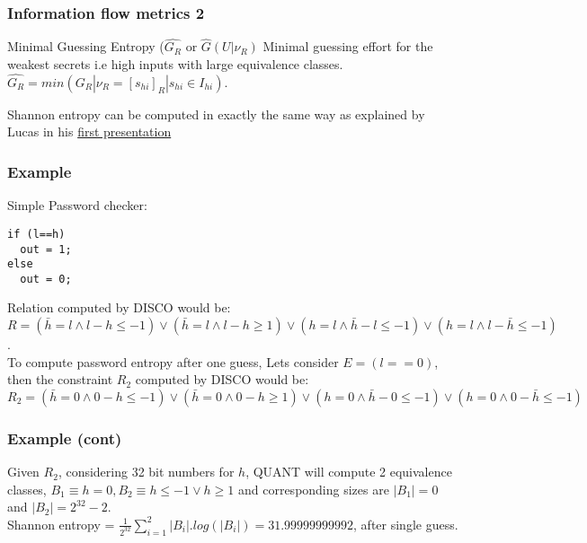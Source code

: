 \documentclass{beamer}
\begin{document}

\begin{frame}
\frametitle{Information flow metrics 2}
\begin{block}{Minimal Guessing Entropy ($\hat{G_{R}}$ or $\hat{G}(U|\nu_{R})$}
Minimal guessing effort for the weakest secrets i.e high inputs with large equivalence classes.\\
$\hat{G_{R}} = min(G_{R}|\nu_{R} = [s_{hi}]_{R} | s_{hi} \in I_{hi})$.
\end{block}
Shannon entropy can be computed in exactly the same way as explained by Lucas in his \href{http://link.springer.com/chapter/10.1007\%2F978-3-642-00596-1_21}{first presentation}
\end{frame}

\begin{frame}[fragile]
\frametitle{Example}
Simple Password checker:
\begin{lstlisting}[basicstyle=\ttfamily]
if (l==h)
  out = 1;
else
  out = 0;
\end{lstlisting}
Relation computed by DISCO would be:\\
$R = (\bar{h} = l \land l - h \leq -1) \lor (\bar{h} = l \land l - h \geq 1) \lor (h = l \land \bar{h} - l \leq -1) \lor (h = l \land l - \bar{h} \leq -1)$. \\
To compute password entropy after one guess, Lets consider $E = (l == 0)$, then the constraint $R_{2}$ computed by DISCO would be: $R_{2} = (\bar{h} = 0 \land 0 - h \leq -1) \lor (\bar{h} = 0 \land 0 - h \geq 1) \lor (h = 0 \land \bar{h} - 0 \leq -1) \lor (h = 0 \land 0 - \bar{h} \leq -1)$\\
\end{frame}

\begin{frame}
\frametitle{Example (cont)}
Given $R_{2}$, considering 32 bit numbers for $h$, QUANT will compute 2 equivalence classes, $B_{1} \equiv h = 0, B_{2} \equiv h \leq -1 \lor h \geq 1$ and corresponding sizes are $|B_{1}| = 0$ and $|B_{2}| = 2^{32} - 2$.\\
Shannon entropy = $\frac{1}{2^{32}} \sum_{i=1}^{2}|B_{i}|.log (|B_{i}|) = 31.99999999992$, after single guess.
\end{frame}
\end{document}
